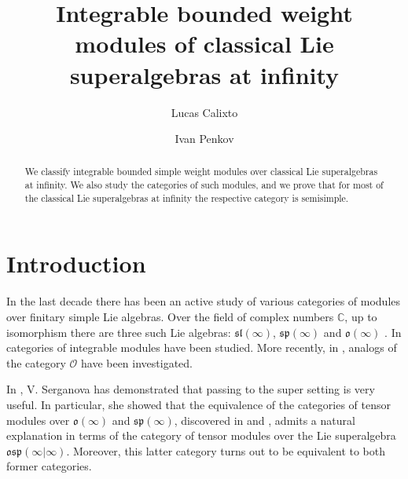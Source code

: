 \documentclass[12pt]{amsart}
\newcommand\C{\mathbb{C}}
\newcommand\fsl{\mathfrak{sl}}
\newcommand\fsp{\mathfrak{sp}}
\newcommand\fosp{\mathfrak{osp}}
\newcommand\fo{\mathfrak{o}}
\newcommand\cO{\mathcal{O}}
\theoremstyle{plain}
\theoremstyle{definition}
\numberwithin{equation}{section}
\begin{document}
%
\title[Integrable bounded weight modules of Lie superalgebras at infinity]{Integrable bounded weight modules of classical Lie superalgebras at infinity}
\author{Lucas Calixto}
\address{L.~Calixto: Department of Mathematics, Federal University of Minas Gerais, Belo Horizonte, Brazil}

\author{Ivan Penkov}
\address{I.~Penkov: Jacobs University Bremen Campus Ring 1, 28759 Bremen, Germany}






\begin{abstract}
We classify integrable bounded simple weight modules over classical Lie superalgebras at infinity. We also study the categories of such modules, and we prove that for most of the classical Lie superalgebras at infinity the respective category is semisimple.
\end{abstract}

\maketitle \thispagestyle{empty}


%
\section{Introduction}
In the last decade there has been an active study of various categories of modules over finitary simple Lie algebras. Over the field of complex numbers $\C$, up to isomorphism there are three such Lie algebras: $\fsl(\infty)$, $\fsp(\infty)$ and $\fo(\infty)$ \cite{Bar99}. In \cite{PS11, D-CPS16} categories of integrable modules have been studied. More recently, in \cite{Nam17, CP19, PS19}, analogs of the category $\cO$ have been investigated. 

In \cite{Ser11}, V. Serganova has demonstrated that passing to the super setting is very useful. In particular, she showed that the equivalence of the categories of tensor modules over $\fo(\infty)$ and $\fsp(\infty)$, discovered in \cite{SS15} and \cite{D-CPS16}, admits a natural explanation in terms of the category of tensor modules over the Lie superalgebra $\fosp(\infty | \infty)$. Moreover, this latter category turns out to be equivalent to both former categories.
\end{document}
